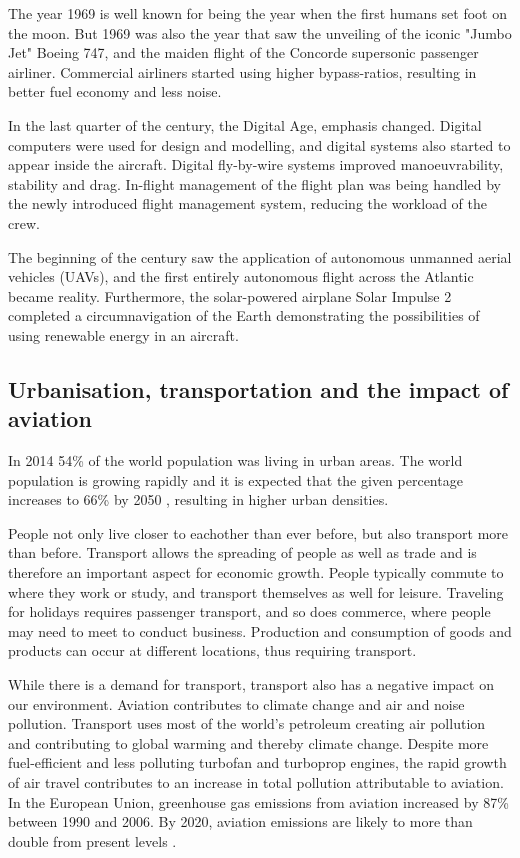 The year 1969 is well known for being the year when the first humans set foot on
the moon. But 1969 was also the year that saw the unveiling of the iconic "Jumbo
Jet" Boeing 747, and the maiden flight of the Concorde supersonic passenger
airliner. Commercial airliners started using higher bypass-ratios, resulting in
better fuel economy and less noise. 

In the last quarter of the  century, the Digital Age, emphasis changed.
Digital computers were used for design and modelling, and digital systems also
started to appear inside the aircraft. Digital fly-by-wire systems improved
manoeuvrability, stability and drag. In-flight management of the flight plan was
being handled by the newly introduced flight management system, reducing the
workload of the crew.

The beginning of the  century saw the application of autonomous unmanned
aerial vehicles (UAVs), and the first entirely autonomous flight across the
Atlantic became reality. Furthermore, the solar-powered airplane Solar Impulse 2
completed a circumnavigation of the Earth demonstrating the possibilities of
using renewable energy in an aircraft.

\subsection{Urbanisation, transportation and the impact of aviation}
In 2014 54\% of the world population was living in urban areas. %
The world population is growing rapidly and it is expected that the given
percentage increases to 66\% by 2050 \cite{UnitedNations2014}, resulting
in higher urban densities.

People not only live closer to eachother than ever before, but also transport
more than before. Transport allows the spreading of people as well as trade and
is therefore an important aspect for economic growth. People typically commute
to where they work or study, and transport themselves as well for leisure.
Traveling for holidays requires passenger transport, and so does commerce, where
people may need to meet to conduct business. Production and consumption of goods
and products can occur at different locations, thus requiring transport.

While there is a demand for transport, transport also has a negative impact on
our environment. Aviation contributes to climate change and air and noise
pollution. Transport uses most of the world's petroleum creating air pollution
and contributing to global warming and thereby climate change. Despite more
fuel-efficient and less polluting turbofan and turboprop engines, the rapid
growth of air travel contributes to an increase in total pollution attributable
to aviation. In the European Union, greenhouse gas emissions from aviation
increased by 87\% between 1990 and 2006. By 2020, aviation emissions are likely
to more than double from present levels \cite{European2006}.

